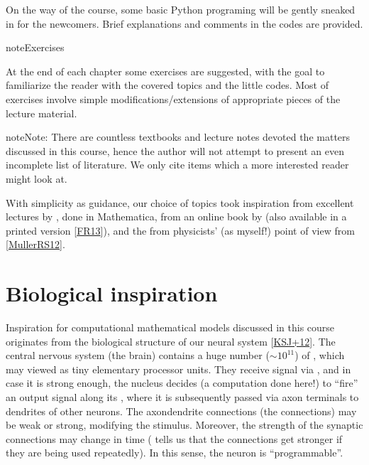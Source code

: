 \documentclass[letterpaper,10pt,english]{jupyterBook}
\begin{document}
\sphinxAtStartPar
On the way of the course, some basic Python programing will be gently sneaked in for the newcomers. Brief explanations and comments in the codes are provided.

\begin{sphinxadmonition}{note}{Exercises}

\sphinxAtStartPar
At the end of each chapter some exercises are suggested, with the goal to familiarize the reader with the covered topics and the little codes. Most of exercises involve simple modifications/extensions of appropriate pieces of the lecture material.
\end{sphinxadmonition}

\begin{sphinxadmonition}{note}{Note:}
\sphinxAtStartPar
There are countless textbooks and lecture notes devoted the matters discussed in this course, hence the author will not attempt to present an even incomplete list of literature. We only cite items which a more interested reader might look at.
\end{sphinxadmonition}

\sphinxAtStartPar
With simplicity as guidance, our choice of topics took inspiration from excellent lectures by , done in Mathematica, from an on\sphinxhyphen{}line book by  (also available in a printed version {[}\hyperlink{cite.docs/conclusion:id8}{FR13}{]}), and the from physicists’ (as myself!) point of view from {[}\hyperlink{cite.docs/conclusion:id7}{MullerRS12}{]}.


\section{Biological inspiration}
\label{\detokenize{docs/intro:biological-inspiration}}
\sphinxAtStartPar
Inspiration for computational mathematical models discussed in this course originates from the biological structure of our neural system {[}\hyperlink{cite.docs/conclusion:id6}{KSJ+12}{]}. The central nervous system (the brain) contains a huge number (\(\sim 10^{11}\)) of , which may viewed as tiny elementary processor units. They receive signal via , and in case it is strong enough, the nucleus decides (a computation done here!) to “fire” an output signal along its , where it is subsequently passed via axon terminals to dendrites of other neurons. The axon\sphinxhyphen{}dendrite connections (the  connections) may be weak or strong, modifying the stimulus. Moreover, the strength of the synaptic connections may change in time ( tells us that the connections get stronger if they are being used repeatedly). In this sense, the neuron is “programmable”.
\end{document}
